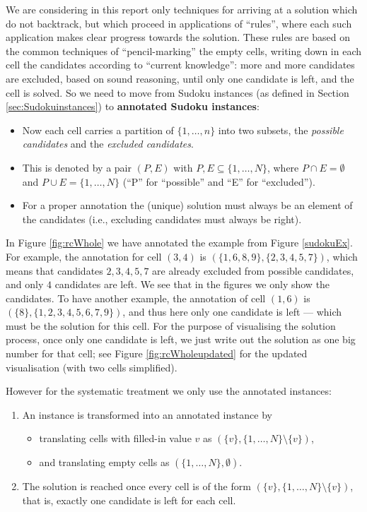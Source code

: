 \documentclass[11pt]{report}
\newcommand{\set}[1]{\{ #1 \}}
\begin{document}
We are considering in this report only techniques for arriving at a solution which do not backtrack, but which proceed in applications of ``rules'', where each such application makes clear progress towards the solution. These rules are based on the common techniques of ``pencil-marking'' the empty cells, writing down in each cell the candidates according to ``current knowledge'': more and more candidates are excluded, based on sound reasoning, until only one candidate is left, and the cell is solved. So we need to move from Sudoku instances (as defined in Section \ref{sec:Sudokuinstances}) to \textbf{annotated Sudoku instances}:
\begin{itemize}
\item Now each cell carries a partition of $\set{1,\dots,n}$ into two subsets, the \emph{possible candidates} and the \emph{excluded candidates}.
\item This is denoted by a pair $(P,E)$ with $P, E \subseteq \set{1,\dots,N}$, where $P \cap E = \emptyset$ and $P \cup E = \set{1,\dots,N}$ (``P'' for ``possible'' and ``E'' for ``excluded'').
\item For a proper annotation the (unique) solution must always be an element of the candidates (i.e., excluding candidates must always be right).
\end{itemize}

In Figure \ref{fig:rcWhole} we have annotated the example from Figure \ref{sudokuEx}. For example, the annotation for cell $(3,4)$ is $(\set{1, 6, 8, 9}, \set{2, 3, 4, 5, 7})$, which means that candidates $2,3,4,5,7$ are already excluded from possible candidates, and only $4$ candidates are left. We see that in the figures we only show the candidates. To have another example, the annotation of cell $(1,6)$ is $(\set{8}, \set{1, 2, 3, 4, 5, 6, 7, 9})$, and thus here only one candidate is left --- which must be the solution for this cell. For the purpose of visualising the solution process, once only one candidate is left, we just write out the solution as one big number for that cell; see Figure \ref{fig:rcWholeupdated} for the updated visualisation (with two cells simplified).

However for the systematic treatment we only use the annotated instances:
\begin{enumerate}
\item An instance is transformed into an annotated instance by
  \begin{itemize}
  \item translating cells with filled-in value $v$ as $(\set{v}, \set{1,\dots,N} \setminus \set{v})$,
  \item and translating empty cells as $(\set{1,\dots,N},\emptyset)$.
  \end{itemize}
\item The solution is reached once every cell is of the form $(\set{v}, \set{1,\dots,N} \setminus \set{v})$, that is, exactly one candidate is left for each cell.
\end{enumerate}
\end{document}
